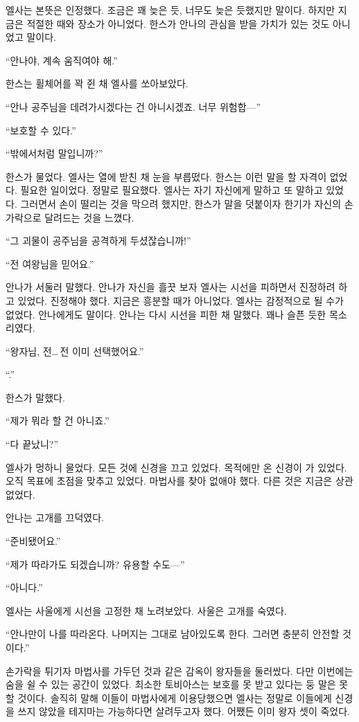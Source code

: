 엘사는 본뜻은 인정했다. 조금은 꽤 늦은 듯, 너무도 늦은 듯했지만 말이다. 하지만 지금은 적절한 때와 장소가 아니었다. 한스가 안나의 관심을 받을 가치가 있는 것도 아니었고 말이다.

``안나야, 계속 움직여야 해.''

한스는 휠체어를 꽉 쥔 채 엘사를 쏘아보았다.

``안나 공주님을 데려가시겠다는 건 아니시겠죠. 너무 위험합—''

``보호할 수 있다.''

``밖에서처럼 말입니까?''

한스가 물었다. 엘사는 열에 받친 채 눈을 부릅떴다. 한스는 이런 말을 할 자격이 없었다. 필요한 일이었다. 정말로 필요했다. 엘사는 자기 자신에게 말하고 또 말하고 있었다. 그러면서 손이 떨리는 것을 막으려 했지만, 한스가 말을 덧붙이자 한기가 자신의 손가락으로 달려드는 것을 느꼈다.

``그 괴물이 공주님을 공격하게 두셨잖습니까!''

``전 여왕님을 믿어요.''

안나가 서둘러 말했다. 안나가 자신을 흘끗 보자 엘사는 시선을 피하면서 진정하려 하고 있었다. 진정해야 했다. 지금은 흥분할 때가 아니었다. 엘사는 감정적으로 될 수가 없었다. 안나에게도 말이다. 안나는 다시 시선을 피한 채 말했다. 꽤나 슬픈 듯한 목소리였다.

``왕자님, 전\ldots\,전 이미 선택했어요.''

``.''

한스가 말했다.

``제가 뭐라 할 건 아니죠.''

``다 끝났니?''

엘사가 멍하니 물었다. 모든 것에 신경을 끄고 있었다. 목적에만 온 신경이 가 있었다. 오직 목표에 초점을 맞추고 있었다. 마법사를 찾아 없애야 했다. 다른 것은 지금은 상관없었다.

안나는 고개를 끄덕였다.

``준비됐어요.''

``제가 따라가도 되겠습니까? 유용할 수도—''

``아니다.''

엘사는 사울에게 시선을 고정한 채 노려보았다. 사울은 고개를 숙였다.

``안나만이 나를 따라온다. 나머지는 그대로 남아있도록 한다. 그러면 충분히 안전할 것이다.''

손가락을 튀기자 마법사를 가두던 것과 같은 감옥이 왕자들을 둘러쌌다. 다만 이번에는 숨을 쉴 수 있는 공간이 있었다. 최소한 토비아스는 보호를 못 받고 있다는 둥 말은 못 할 것이다. 솔직히 말해 이들이 마법사에게 이용당했으면 엘사는 정말로 이들에게 신경을 쓰지 않았을 테지마는 가능하다면 살려두고자 했다. 어쨌든 이미 왕자 셋이 죽었다.

